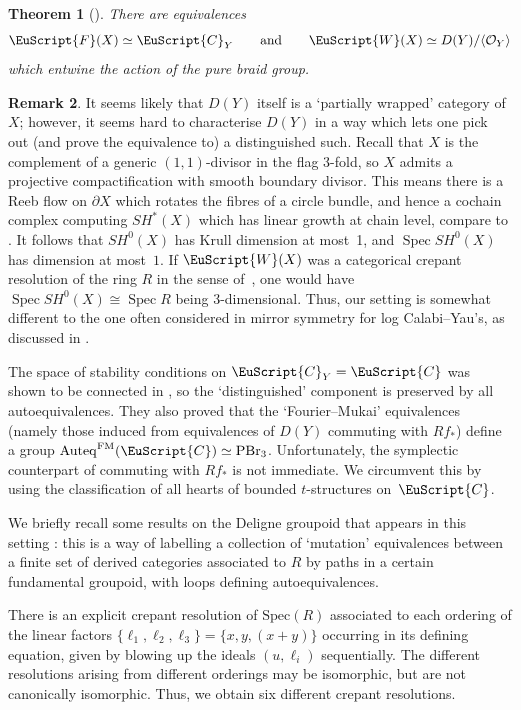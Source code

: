 \documentclass[pdftex]{sigma}
\DeclareMathOperator{\Auteq}{Auteq}
\newcommand{\scrF}{\EuScript{F}}
\newcommand{\scrC}{\EuScript{C}}
\def\scrW{\EuScript{W}}
\newtheorem{thm}{Theorem}[section]
\theoremstyle{definition}
\newtheorem{rmk}[thm]{Remark}
\numberwithin{equation}{section}
\begin{document}
\begin{thm}[{\cite[Proposition 4.27\,(1) and Corollary 5.7]{Smith-Wemyss}}]
There are equivalences
\[
\scrF(X) \simeq \scrC_Y \qquad \mathrm{and} \qquad \scrW(X) \simeq D(Y)/\langle \mathcal{O}_Y \rangle
\]
which entwine the action of the pure braid group.
\end{thm}

\begin{rmk} It seems likely that $D(Y)$ itself is a `partially wrapped' category of $X$; however, it seems hard to characterise $D(Y)$ in a way which lets one pick out (and prove the equivalence to) a distinguished such. Recall that $X$ is the complement of a generic $(1,1)$-divisor in the flag 3-fold, so $X$ admits a projective compactification with smooth boundary divisor. This means there is a Reeb flow on $\partial X$ which rotates the fibres of a circle bundle, and hence a cochain complex computing $SH^*(X)$ which has linear growth at chain level, compare to \cite[Section~4a]{Seidel:bias}. It follows that $SH^0(X)$ has Krull dimension at most~1, and $\operatorname{Spec} SH^0(X)$ has dimension at most~$1$. If $\scrW(X)$ was a categorical crepant resolution of the ring $R$ in the sense of~\cite{Pomerleano}, one would have $\operatorname{Spec} SH^0(X) \cong \operatorname{Spec}R$ being 3-dimensional. Thus, our setting is somewhat different to the one often considered in mirror symmetry for log Calabi--Yau's, as discussed in \cite{Pomerleano}.
\end{rmk}

 The space of stability conditions on $\scrC_Y = \scrC$ was shown to be connected in \cite{Hara-Wemyss}, so the `distinguished' component is preserved by all autoequivalences. They also proved that the `Fourier--Mukai' equivalences (namely those induced from equivalences of $D(Y)$ commuting with $Rf_*$) define a group $\Auteq^{\rm FM}(\scrC) \simeq {\rm PBr}_3$. Unfortunately, the symplectic counterpart of commuting with $Rf_*$ is not immediate. We circumvent this by using the classification of all hearts of bounded $t$-structures on~$\scrC$.

We briefly recall some results on the Deligne groupoid that appears in this setting \cite{Donovan-Wemyss, Hara-Wemyss}: this is a way of labelling a collection of `mutation' equivalences between a finite set of derived categories associated to $R$ by paths in a certain fundamental groupoid, with loops defining autoequivalences.

There is an explicit crepant resolution of $\mathrm{Spec}(R)$ associated to each ordering of the linear factors $\{\ell_1,\ell_2,\ell_3 \} = \{x,y,(x+y)\}$ occurring in its defining equation, given by blowing up the ideals $(u,\ell_i)$ sequentially. The different resolutions arising from different orderings may be isomorphic, but are not canonically isomorphic. Thus, we obtain six different crepant resolutions.
\end{document}
